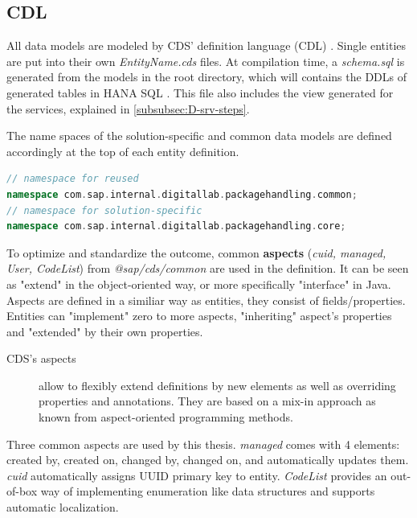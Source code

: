 \subsection{CDL}
\label{subsec:db-cdl}
All data models are modeled by CDS' definition language (CDL) \cite{cap-cds-cdl}. Single entities are put into their own \textit{EntityName.cds} files. 
At compilation time, a \textit{schema.sql} is generated from the models in the root directory, which will contains the DDLs of generated tables in HANA SQL \cite{hanasql}. This file also includes the view generated for the services, explained in \autoref{subsubsec:D-srv-steps}.


The name spaces of the solution-specific and common data models are defined accordingly at the top of each entity definition.

\begin{lstlisting}[language={c++}]
// namespace for reused
namespace com.sap.internal.digitallab.packagehandling.common; 
// namespace for solution-specific
namespace com.sap.internal.digitallab.packagehandling.core; 
\end{lstlisting}


To optimize and standardize the outcome, common \textbf{aspects} (\textit{cuid, managed, User, CodeList}) from \textit{@sap/cds/common} are used in the definition. \cite{cap-cds-common-aspects} It can be seen as "extend" in the object-oriented way, or more specifically "interface" in Java. Aspects are defined in a similiar way as entities, they consist of fields/properties. Entities can "implement" zero to more aspects, "inheriting" aspect's properties and "extended" by their own properties. 

\begin{description}
    \item[CDS's aspects] allow to flexibly extend definitions by new elements as well as overriding properties and annotations. They are based on a mix-in approach as known from aspect-oriented programming methods. \cite{cap-cds-common-aspects}
\end{description}

Three common aspects are used by this thesis. \textit{managed} comes with 4 elements: created by, created on, changed by, changed on, and automatically updates them. \textit{cuid} automatically assigns UUID primary key to entity. \textit{CodeList} provides an out-of-box way of implementing enumeration like data structures and supports automatic localization.


